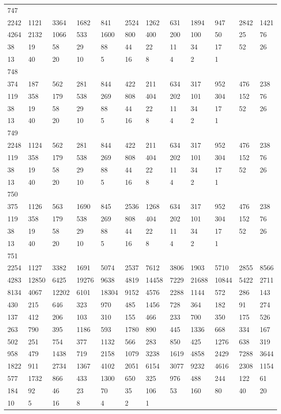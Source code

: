 \begin{longtable}{llllllllllll}
747&&&&&&&&&&&\\
2242& 1121& 3364& 1682& 841& 2524& 1262& 631& 1894& 947& 2842& 1421\\
4264& 2132& 1066& 533& 1600& 800& 400& 200& 100& 50& 25& 76\\
38& 19& 58& 29& 88& 44& 22& 11& 34& 17& 52& 26\\
13& 40& 20& 10& 5& 16& 8& 4& 2& 1& \\

748&&&&&&&&&&&\\
374& 187& 562& 281& 844& 422& 211& 634& 317& 952& 476& 238\\
119& 358& 179& 538& 269& 808& 404& 202& 101& 304& 152& 76\\
38& 19& 58& 29& 88& 44& 22& 11& 34& 17& 52& 26\\
13& 40& 20& 10& 5& 16& 8& 4& 2& 1& \\

749&&&&&&&&&&&\\
2248& 1124& 562& 281& 844& 422& 211& 634& 317& 952& 476& 238\\
119& 358& 179& 538& 269& 808& 404& 202& 101& 304& 152& 76\\
38& 19& 58& 29& 88& 44& 22& 11& 34& 17& 52& 26\\
13& 40& 20& 10& 5& 16& 8& 4& 2& 1& \\

750&&&&&&&&&&&\\
375& 1126& 563& 1690& 845& 2536& 1268& 634& 317& 952& 476& 238\\
119& 358& 179& 538& 269& 808& 404& 202& 101& 304& 152& 76\\
38& 19& 58& 29& 88& 44& 22& 11& 34& 17& 52& 26\\
13& 40& 20& 10& 5& 16& 8& 4& 2& 1& \\

751&&&&&&&&&&&\\
2254& 1127& 3382& 1691& 5074& 2537& 7612& 3806& 1903& 5710& 2855& 8566\\
4283& 12850& 6425& 19276& 9638& 4819& 14458& 7229& 21688& 10844& 5422& 2711\\
8134& 4067& 12202& 6101& 18304& 9152& 4576& 2288& 1144& 572& 286& 143\\
430& 215& 646& 323& 970& 485& 1456& 728& 364& 182& 91& 274\\
137& 412& 206& 103& 310& 155& 466& 233& 700& 350& 175& 526\\
263& 790& 395& 1186& 593& 1780& 890& 445& 1336& 668& 334& 167\\
502& 251& 754& 377& 1132& 566& 283& 850& 425& 1276& 638& 319\\
958& 479& 1438& 719& 2158& 1079& 3238& 1619& 4858& 2429& 7288& 3644\\
1822& 911& 2734& 1367& 4102& 2051& 6154& 3077& 9232& 4616& 2308& 1154\\
577& 1732& 866& 433& 1300& 650& 325& 976& 488& 244& 122& 61\\
184& 92& 46& 23& 70& 35& 106& 53& 160& 80& 40& 20\\
10& 5& 16& 8& 4& 2& 1& \\


\end{longtable}
